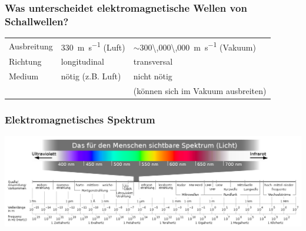 \documentclass{beamer}
\begin{document}
\begin{frame}
\frametitle{Was unterscheidet elektromagnetische Wellen von Schallwellen?}

\pause

\begin{tabular}{|l|l|l|}
\hline
        & \color{theme}{\textbf{Schallwellen}}  & \color{theme}{\textbf{Elektromagnetische Wellen}}     \\
\hline
Ausbreitung       & \SI{330}{\meter\per\second} (Luft)  &  \(\sim\)\SI{300\,000\,000}{\meter\per\second} (Vakuum)   \\
\hline
Richtung        & longitudinal  & transversal   \\
\hline
Medium          & nötig (z.B. Luft)        & nicht nötig \\ 
&                       & (können sich im Vakuum ausbreiten)       \\
\hline
\end{tabular}


\end{frame}


\begin{frame}
\frametitle{Elektromagnetisches Spektrum}

\begin{center}
\includegraphics[width=\textwidth]{Electromagnetic_spectrum.png}
\end{center}

\end{frame}



\end{document}

